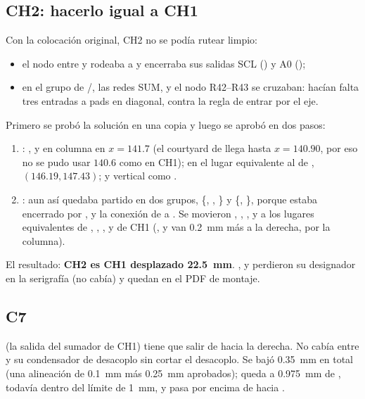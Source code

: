 \subsection{CH2: hacerlo igual a CH1}
Con la colocación original, CH2 no se podía rutear limpio:
\begin{itemize}
  \item el nodo entre  y  rodeaba a  y encerraba sus salidas SCL () y A0
        ();
  \item en el grupo de /, las redes SUM,  y el nodo R42--R43 se cruzaban: hacían
        falta tres entradas a pads en diagonal, contra la regla de entrar por el eje.
\end{itemize}
Primero se probó la solución en una copia y luego se aprobó en dos pasos:
\begin{enumerate}
  \item {}: ,  y  en columna en $x = \num{141.7}$ (el courtyard
        de  llega hasta $x = \num{140.90}$, por eso no se pudo usar $\num{140.6}$ como en CH1);  en
        el lugar equivalente al de , $(\num{146.19}, \num{147.43})$; y  vertical como .
  \item {}: aun así  quedaba partido en dos grupos,
        \{, , \} y \{, \}, porque  estaba encerrado por
        ,  y la conexión de  a . Se movieron , ,
        ,  y  a los lugares equivalentes de , , ,  y
         de CH1 (,  y  van \SI{0.2}{\milli\meter} más a la derecha, por la
        columna).
\end{enumerate}
El resultado: \textbf{CH2 es CH1 desplazado \SI{22.5}{\milli\meter}}. ,  y  perdieron su
designador en la serigrafía (no cabía) y quedan en el PDF de montaje.

\subsection{C7}
 (la salida del sumador de CH1) tiene que salir de  hacia la derecha. No cabía entre
 y su condensador de desacoplo  sin cortar el desacoplo. Se bajó  \SI{0.35}{\milli\meter}
en total (una alineación de \SI{0.1}{\milli\meter} más \SI{0.25}{\milli\meter} aprobados); queda a
\SI{0.975}{\milli\meter} de , todavía dentro del límite de \SI{1}{\milli\meter}, y  pasa por
encima de  hacia .

